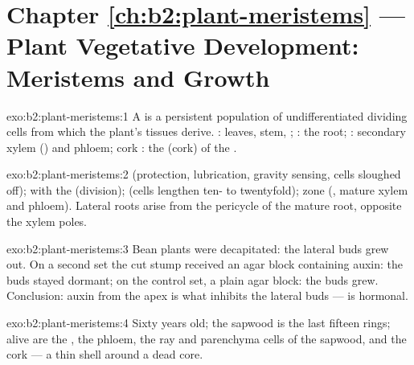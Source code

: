 \section*{Chapter \ref{ch:b2:plant-meristems} --- Plant Vegetative Development: Meristems and Growth}

\begin{solution}{exo:b2:plant-meristems:1}
A  is a persistent population of undifferentiated dividing
cells from which the plant's tissues derive. :
leaves, stem, ; : the root; : secondary xylem () and phloem; cork : the
 (cork) of the .
\end{solution}

\begin{solution}{exo:b2:plant-meristems:2}
 (protection, lubrication, gravity sensing, cells sloughed
off);  with the  (division); 
(cells lengthen ten- to twentyfold);  zone (, mature xylem and phloem). Lateral roots arise from the
pericycle of the mature root, opposite the xylem poles.
\end{solution}

\begin{solution}{exo:b2:plant-meristems:3}
Bean plants were decapitated: the lateral buds grew out. On a
second set the cut stump received an agar block containing auxin:
the buds stayed dormant; on the control set, a plain agar block: the
buds grew. Conclusion: auxin from the apex is what inhibits the
lateral buds ---  is hormonal.
\end{solution}

\begin{solution}{exo:b2:plant-meristems:4}
Sixty years old; the sapwood is the last fifteen rings; alive are
the , the phloem, the ray and parenchyma cells of the
sapwood, and the cork  --- a thin shell around a dead core.
\end{solution}

